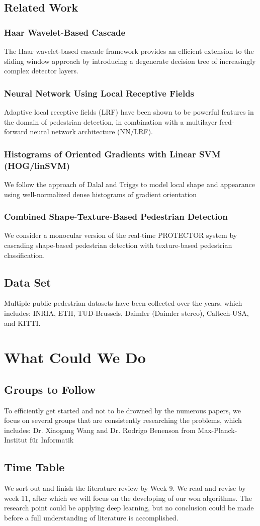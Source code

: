 \documentclass[conference]{IEEEtran}
\begin{document}
\subsection{Related Work}
\subsubsection{Haar Wavelet-Based Cascade}
The Haar wavelet-based cascade framework provides
an efficient extension to the sliding window approach by
introducing a degenerate decision tree of increasingly
complex detector layers. 
\subsubsection{Neural Network Using Local Receptive Fields}
Adaptive local receptive fields (LRF) have been shown
to be powerful features in the domain of pedestrian
detection, in combination with a multilayer feed-forward
neural network architecture (NN/LRF).
\subsubsection{Histograms of Oriented Gradients with Linear SVM (HOG/linSVM)}
We follow the approach of Dalal and Triggs to model
local shape and appearance using well-normalized dense
histograms of gradient orientation
\subsubsection{Combined Shape-Texture-Based Pedestrian Detection}
We consider a monocular version of the real-time PROTECTOR system by cascading shape-based
pedestrian detection with texture-based pedestrian classification.
\subsection{Data Set}
Multiple public pedestrian datasets have been collected over the years, which includes:
INRIA, ETH, TUD-Brussels, Daimler (Daimler stereo), Caltech-USA, and KITTI.
\section{What Could We Do}
\subsection{Groups to Follow}
To efficiently get started and not to be drowned by the numerous papers,
we focus on several groups that are consistently researching the problems, which includes:
Dr. Xiaogang Wang \cite{W1,W2,W3,W4,W5,W6,W7} and 
Dr. Rodrigo Benenson from Max-Planck-Institut f\"ur Informatik \cite{R1,R2,R3,R4,R5,R6,R7}
\subsection{Time Table}
We sort out and finish the literature review by Week 9. 
We read and revise by week 11, after which we will focus on the developing of our won algorithms.
The research point could be applying deep learning, 
but no conclusion could be made before a full understanding of literature is accomplished.


\end{document}
